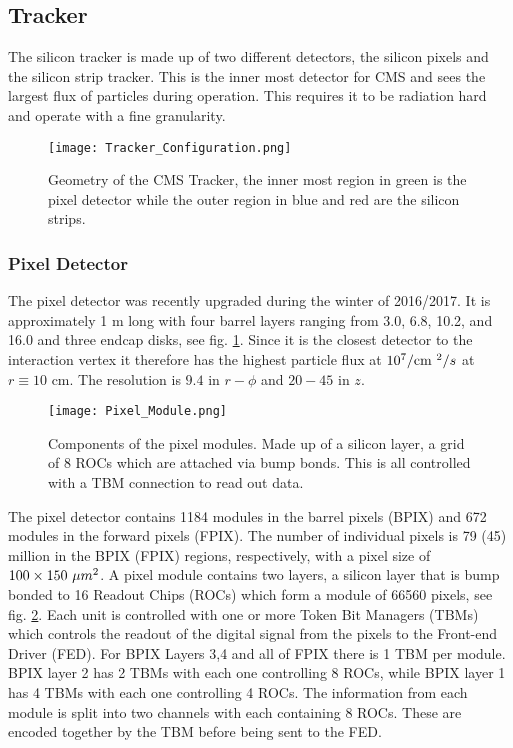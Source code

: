\subsection{Tracker}
\label{sec:Tracker}

The silicon tracker is made up of two different detectors, the silicon pixels and the silicon strip tracker. This is the inner most detector for CMS and sees the largest flux of particles during operation. This requires it to be radiation hard and operate with a fine granularity. 

\begin{figure}
 	\centering
	\texttt{[image: Tracker\_Configuration.png]}
 	\caption{Geometry of the CMS Tracker, the inner most region in green is the pixel detector while the outer region in blue and red are the silicon strips.}
 	\label{CMSTracker} 
\end{figure}

\subsubsection{Pixel Detector}
\label{subsec:Pixel}

The pixel detector was recently upgraded during the winter of 2016/2017. It is approximately 1 m long with four barrel layers ranging from 3.0, 6.8, 10.2, and 16.0 \cm  and three endcap disks, see fig. \ref{CMSTracker}. Since it is the closest detector to the interaction vertex it therefore has the highest particle flux at $10^7/\text{cm }^2/s$ at $r\equiv10$ cm. The resolution is $9.4$ \mum in $r-\phi$ and $20-45$ \mum in $z$.

\begin{figure}
 	\centering
	\texttt{[image: Pixel\_Module.png]}
 	\caption{Components of the pixel modules. Made up of a silicon layer, a grid of 8 ROCs which are attached via bump bonds. This is all controlled with a TBM connection to read out data.}
 	\label{PixelModule} 
\end{figure}

The pixel detector contains 1184 modules in the barrel pixels (BPIX) and 672 modules in the forward pixels (FPIX). The number of individual pixels is 79 (45) million in the BPIX (FPIX) regions, respectively, with a pixel size of $100\times150 \text{ }\text{}\mu m^2$. A pixel module contains two layers, a silicon layer that is bump bonded to 16 Readout Chips (ROCs) which form a module of 66560 pixels, see fig. \ref{PixelModule}. Each unit is controlled with one or more Token Bit Managers (TBMs) which controls the readout of the digital signal from the pixels to the Front-end Driver (FED). For BPIX Layers 3,4 and all of FPIX there is 1 TBM per module. BPIX layer 2 has 2 TBMs with each one controlling 8 ROCs, while BPIX layer 1 has 4 TBMs with each one controlling 4 ROCs. The information from each module is split into two channels with each containing 8 ROCs. These are encoded together by the TBM before being sent to the FED.

